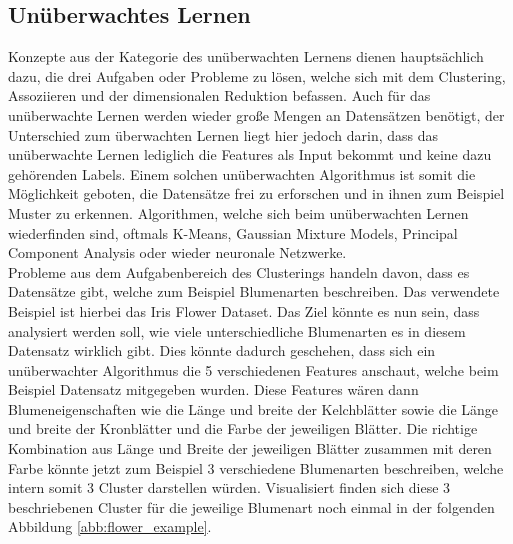 \documentclass[]{iat}
\begin{document}
\subsection{Unüberwachtes Lernen} \label{sec:unueberwachtes_lernen}
Konzepte aus der Kategorie des unüberwachten Lernens dienen hauptsächlich dazu, die drei Aufgaben oder Probleme zu lösen, welche sich mit dem Clustering, Assoziieren und der dimensionalen Reduktion befassen. Auch für das unüberwachte Lernen werden wieder große Mengen an Datensätzen benötigt, der Unterschied zum überwachten Lernen liegt hier jedoch darin, dass das unüberwachte Lernen lediglich die Features als Input bekommt und keine dazu gehörenden Labels. Einem solchen unüberwachten Algorithmus ist somit die Möglichkeit geboten, die Datensätze frei zu erforschen und in ihnen zum Beispiel Muster zu erkennen. Algorithmen, welche sich beim unüberwachten Lernen wiederfinden sind, oftmals K-Means, Gaussian Mixture Models, Principal Component Analysis oder wieder neuronale Netzwerke.\\
Probleme aus dem Aufgabenbereich des Clusterings handeln davon, dass es Datensätze gibt, welche zum Beispiel Blumenarten beschreiben. Das verwendete Beispiel ist hierbei das Iris Flower Dataset. \cite[]{Dua:2019} Das Ziel könnte es nun sein, dass analysiert werden soll, wie viele unterschiedliche Blumenarten es in diesem Datensatz wirklich gibt. Dies könnte dadurch geschehen, dass sich ein unüberwachter Algorithmus die 5 verschiedenen Features anschaut, welche beim Beispiel Datensatz mitgegeben wurden. Diese Features wären dann Blumeneigenschaften wie die Länge und breite der Kelchblätter sowie die Länge und breite der Kronblätter und die Farbe der jeweiligen Blätter. Die richtige Kombination aus Länge und Breite der jeweiligen Blätter zusammen mit deren Farbe könnte jetzt zum Beispiel 3 verschiedene Blumenarten beschreiben, welche intern somit 3 Cluster darstellen würden. Visualisiert finden sich diese 3 beschriebenen Cluster für die jeweilige Blumenart noch einmal in der folgenden Abbildung \ref{abb:flower_example}.
\end{document}
